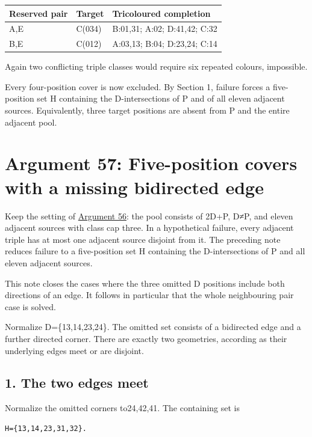 \documentclass[
  10pt,
]{article}
\begin{document}
\begin{longtable}[]{@{}lll@{}}
\toprule\noalign{}
Reserved pair & Target & Tricoloured completion \\
\midrule\noalign{}
\endhead
\bottomrule\noalign{}
\endlastfoot
A,E & C(034) & B:01,31; A:02; D:41,42; C:32 \\
B,E & C(012) & A:03,13; B:04; D:23,24; C:14 \\
\end{longtable}

Again two conflicting triple classes would require six repeated colours,
impossible.

Every four-position cover is now excluded. By Section 1, failure forces
a five-position set H containing the D-intersections of P and of all
eleven adjacent sources. Equivalently, three target positions are absent
from P and the entire adjacent pool.

\hypertarget{arg-57}{%
\section{Argument 57: Five-position covers with a missing bidirected
edge}\label{arg-57}}

Keep the setting of \protect\hyperlink{arg-56}{Argument 56}: the pool
consists of 2D+P, D≠P, and eleven adjacent sources with class cap three.
In a hypothetical failure, every adjacent triple has at most one
adjacent source disjoint from it. The preceding note reduces failure to
a five-position set H containing the D-intersections of P and all eleven
adjacent sources.

This note closes the cases where the three omitted D positions include
both directions of an edge. It follows in particular that the whole
neighbouring pair case is solved.

Normalize D=\{13,14,23,24\}. The omitted set consists of a bidirected
edge and a further directed corner. There are exactly two geometries,
according as their underlying edges meet or are disjoint.

\hypertarget{the-two-edges-meet}{%
\subsection*{1. The two edges meet}\label{the-two-edges-meet}}

Normalize the omitted corners to24,42,41. The containing set is

\begin{verbatim}
H={13,14,23,31,32}.
\end{verbatim}
\end{document}
